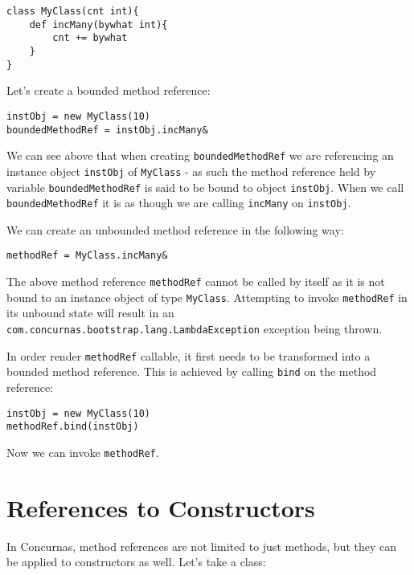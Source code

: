 \documentclass[conc-doc]{subfiles}
\begin{document}
\begin{lstlisting}
class MyClass(cnt int){
	def incMany(bywhat int){
		cnt += bywhat
	}
}
\end{lstlisting}

Let's create a bounded method reference:

\begin{lstlisting}
instObj = new MyClass(10)
boundedMethodRef = instObj.incMany&
\end{lstlisting}

\begin{sloppypar}
We can see above that when creating \lstinline{boundedMethodRef} we are referencing an instance object \lstinline{instObj} of \lstinline{MyClass} - as such the method reference held by variable \lstinline{boundedMethodRef} is said to be bound to object \lstinline{instObj}. When we call \lstinline{boundedMethodRef} it is as though we are calling \lstinline{incMany} on \lstinline{instObj}.
\end{sloppypar}
	
We can create an unbounded method reference in the following way:

\begin{lstlisting}
methodRef = MyClass.incMany&
\end{lstlisting}

The above method reference \lstinline{methodRef} cannot be called by itself as it is not bound to an instance object of type \lstinline{MyClass}. Attempting to invoke \lstinline{methodRef} in its unbound state will result in an \lstinline{com.concurnas.bootstrap.lang.LambdaException} exception being thrown.

In order render \lstinline{methodRef} callable, it first needs to be transformed into a bounded method reference. This is achieved by calling \lstinline{bind} on the method reference:

\begin{lstlisting}
instObj = new MyClass(10)
methodRef.bind(instObj)
\end{lstlisting}

Now we can invoke \lstinline{methodRef}.

\section{References to Constructors}
In Concurnas, method references are not limited to just methods, but they can be applied to constructors as well. Let's take a class:
\end{document}
